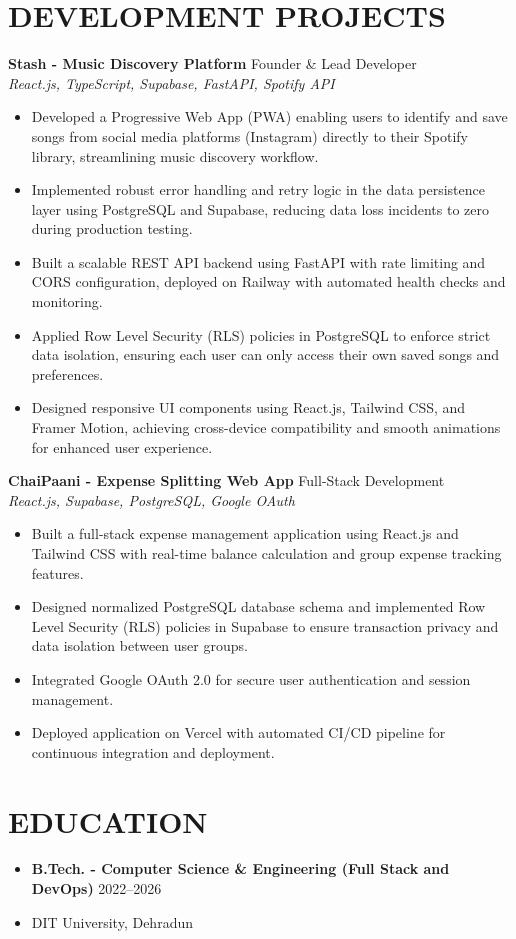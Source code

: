 \documentclass[11pt, a4paper]{article}
\newcommand{\cvitem}[3]{%
  \vspace{0.05in}
  \textbf{#1} \hfill \footnotesize{#2}\\
  \textit{#3}\vspace{0.05in}
}
\begin{document}
\section*{DEVELOPMENT PROJECTS}
\cvitem{Stash - Music Discovery Platform}{Founder \& Lead Developer}{React.js, TypeScript, Supabase, FastAPI, Spotify API}
\begin{itemize}
    \item Developed a Progressive Web App (PWA) enabling users to identify and save songs from social media platforms (Instagram) directly to their Spotify library, streamlining music discovery workflow.
    \item Implemented robust error handling and retry logic in the data persistence layer using PostgreSQL and Supabase, reducing data loss incidents to zero during production testing.
    \item Built a scalable REST API backend using FastAPI with rate limiting and CORS configuration, deployed on Railway with automated health checks and monitoring.
    \item Applied Row Level Security (RLS) policies in PostgreSQL to enforce strict data isolation, ensuring each user can only access their own saved songs and preferences.
    \item Designed responsive UI components using React.js, Tailwind CSS, and Framer Motion, achieving cross-device compatibility and smooth animations for enhanced user experience.
\end{itemize}
\cvitem{ChaiPaani - Expense Splitting Web App}{Full-Stack Development}{React.js, Supabase, PostgreSQL, Google OAuth}
\begin{itemize}
    \item Built a full-stack expense management application using React.js and Tailwind CSS with real-time balance calculation and group expense tracking features.
    \item Designed normalized PostgreSQL database schema and implemented Row Level Security (RLS) policies in Supabase to ensure transaction privacy and data isolation between user groups.
    \item Integrated Google OAuth 2.0 for secure user authentication and session management.
    \item Deployed application on Vercel with automated CI/CD pipeline for continuous integration and deployment.
\end{itemize}
\section*{EDUCATION}
\begin{itemize}
    \item \textbf{B.Tech. - Computer Science \& Engineering (Full Stack and DevOps)} \hfill 2022--2026
    \item DIT University, Dehradun
\end{itemize}
\end{document}
